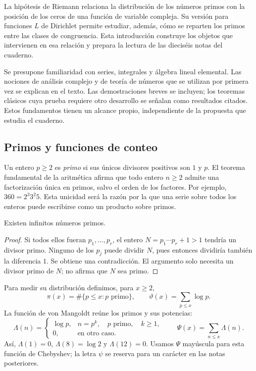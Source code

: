\label{sec:introduccion}

La hipótesis de Riemann relaciona la distribución de los números primos con
la posición de los ceros de una función de variable compleja. Su versión
para funciones $L$ de Dirichlet permite estudiar, además, cómo se reparten
los primos entre las clases de congruencia. Esta introducción construye los
objetos que intervienen en esa relación y prepara la lectura de las dieciséis
notas del cuaderno.

Se presupone familiaridad con series, integrales y álgebra lineal elemental.
Las nociones de análisis complejo y de teoría de números que se utilizan
por primera vez se explican en el texto. Las demostraciones breves se
incluyen; los teoremas clásicos cuya prueba requiere otro desarrollo se
señalan como resultados citados. Estos fundamentos tienen un alcance
propio, independiente de la propuesta que estudia el cuaderno.

\subsection{Primos y funciones de conteo}

Un entero $p\ge2$ es \emph{primo} si sus únicos divisores positivos son
$1$ y $p$. El teorema fundamental de la aritmética afirma que todo entero
$n\ge2$ admite una factorización única en primos, salvo el orden de los
factores. Por ejemplo, $360=2^3 3^2 5$. Esta unicidad será la razón por la
que una serie sobre todos los enteros puede escribirse como un producto
sobre primos.

\begin{proposicion}
Existen infinitos números primos.
\end{proposicion}
\begin{proof}
Si todos ellos fueran $p_1,\ldots,p_r$, el entero
$N=p_1\cdots p_r+1>1$ tendría un divisor primo. Ninguno de los $p_j$
puede dividir $N$, pues entonces dividiría también la diferencia $1$.
Se obtiene una contradicción. El argumento solo necesita un divisor primo
de $N$; no afirma que $N$ sea primo.
\end{proof}

Para medir su distribución definimos, para $x\ge2$,
\[
 \pi(x)=\#\{p\le x:p\text{ primo}\},\qquad
 \vartheta(x)=\sum_{p\le x}\log p.
\]
La función de von Mangoldt reúne los primos y sus potencias:
\[
 \Lambda(n)=
 \begin{cases}
  \log p,&n=p^k,\quad p\text{ primo},\quad k\ge1,\\
  0,&\text{en otro caso}.
 \end{cases}
 \qquad
 \Psi(x)=\sum_{n\le x}\Lambda(n).
\]
Así, $\Lambda(1)=0$, $\Lambda(8)=\log2$ y $\Lambda(12)=0$.
Usamos $\Psi$ mayúscula para esta función de Chebyshev; la letra $\psi$
se reserva para un carácter en las notas posteriores.

